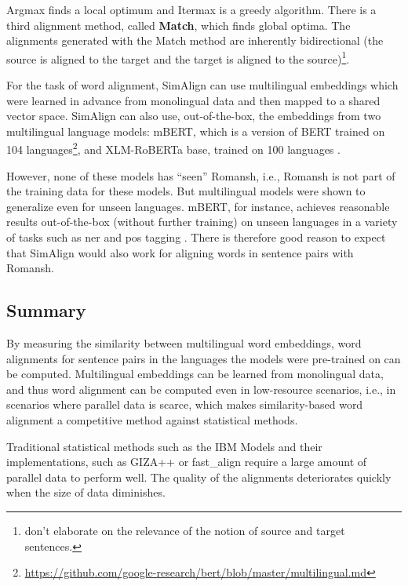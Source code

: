 Argmax finds a local optimum and Itermax is a greedy algorithm. 
There is a third alignment method, called \textbf{Match}, which finds global optima. 
The alignments generated with the Match method are inherently bidirectional (the source is aligned to the target and the target is aligned to the source)\footnote{\textcite{jalili-sabet-etal-2020-simalign} don't elaborate on the relevance  of the notion of source and target sentences.}.

For the task of word alignment, SimAlign can use multilingual embeddings which were learned in advance from monolingual data and then mapped to a shared vector space. 
SimAlign can also use, out-of-the-box, the embeddings from two multilingual language models: mBERT, which is a version of BERT \autocite{delvin-chang-2018-bert} trained on 104 languages\footnote{\url{https://github.com/google-research/bert/blob/master/multilingual.md}}, and XLM-RoBERTa base, trained on 100 languages \autocite{conneau-etal-2020-xlm}. 

However, none of these models has \enquote{seen} Romansh, i.e., Romansh is not part of the training data for these models. 
But multilingual models were shown to generalize even for unseen languages. 
mBERT, for instance, achieves reasonable results out-of-the-box (without further training) on unseen languages in a variety of tasks such as \acrfull{ner} and \acrfull{pos} tagging \autocite{pires-etal-2019-multilingual}. 
There is therefore good reason to expect that SimAlign would also work for aligning words in sentence pairs with Romansh.


\subsection{Summary}
By measuring the similarity between multilingual word embeddings, word alignments for sentence pairs in the languages the models were pre-trained on can be computed. 
Multilingual embeddings can be learned from monolingual data, and thus word alignment can be computed even in low-resource scenarios, i.e., in scenarios where parallel data is scarce, which makes similarity-based word alignment a competitive method against statistical methods. 

Traditional statistical methods such as the IBM Models \autocite{brown-etal-1993-mathematics} and their implementations, such as GIZA++ \autocite{och-ney-2003-smt} or fast\_align \autocite{dyer-etal-2013-simple} require a large amount of parallel data to perform well.
The quality of the alignments deteriorates quickly when the size of data diminishes\footnotemark. 

